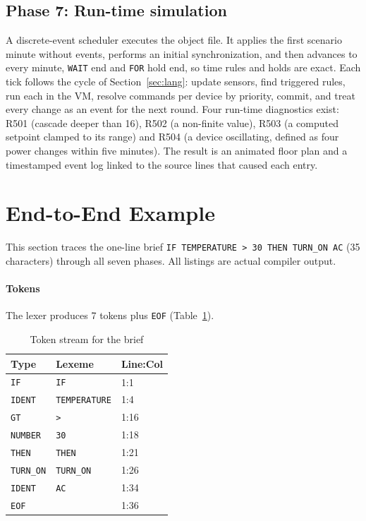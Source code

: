 \documentclass[conference]{IEEEtran}
\newcommand{\code}[1]{\texttt{#1}}
\begin{document}
\subsection{Phase 7: Run-time simulation}
A discrete-event scheduler executes the object file. It applies the first scenario minute without events, performs an initial synchronization, and then advances to every minute, \code{WAIT} end and \code{FOR} hold end, so time rules and holds are exact. Each tick follows the cycle of Section~\ref{sec:lang}: update sensors, find triggered rules, run each in the VM, resolve commands per device by priority, commit, and treat every change as an event for the next round. Four run-time diagnostics exist: R501 (cascade deeper than 16), R502 (a non-finite value), R503 (a computed setpoint clamped to its range) and R504 (a device oscillating, defined as four power changes within five minutes). The result is an animated floor plan and a timestamped event log linked to the source lines that caused each entry.

\section{End-to-End Example}

This section traces the one-line brief \code{IF TEMPERATURE > 30 THEN TURN\_ON AC} (35 characters) through all seven phases. All listings are actual compiler output.

\paragraph{Tokens} The lexer produces 7 tokens plus \code{EOF} (Table~\ref{tab:tokens}).

\begin{table}[h]
\centering
\caption{Token stream for the brief}
\label{tab:tokens}
\footnotesize
\begin{tabular}{@{}l l l@{}}
\toprule
Type & Lexeme & Line:Col \\
\midrule
\code{IF} & \code{IF} & 1:1 \\
\code{IDENT} & \code{TEMPERATURE} & 1:4 \\
\code{GT} & \code{>} & 1:16 \\
\code{NUMBER} & \code{30} & 1:18 \\
\code{THEN} & \code{THEN} & 1:21 \\
\code{TURN\_ON} & \code{TURN\_ON} & 1:26 \\
\code{IDENT} & \code{AC} & 1:34 \\
\code{EOF} & & 1:36 \\
\bottomrule
\end{tabular}
\end{table}
\end{document}
